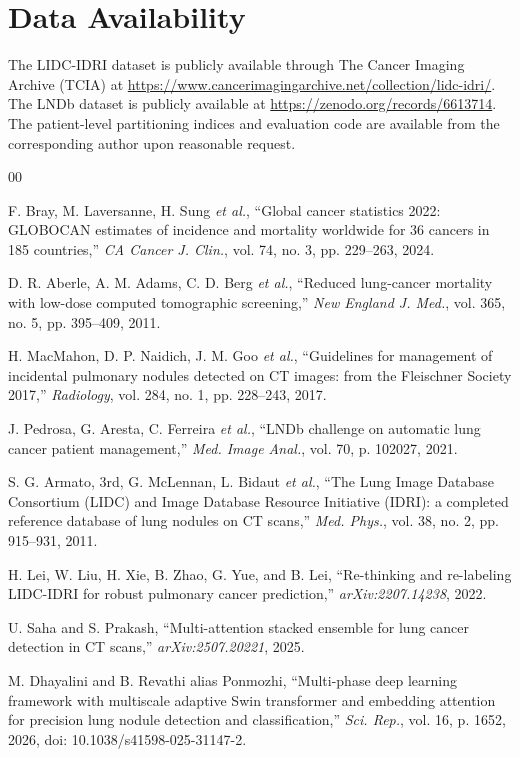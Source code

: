\documentclass{ieeeaccess}
\begin{document}
\section*{Data Availability}
The LIDC-IDRI dataset is publicly available through The Cancer Imaging Archive (TCIA) at \url{https://www.cancerimagingarchive.net/collection/lidc-idri/}. The LNDb dataset is publicly available at \url{https://zenodo.org/records/6613714}. The patient-level partitioning indices and evaluation code are available from the corresponding author upon reasonable request.

\begin{thebibliography}{00}

 F. Bray, M. Laversanne, H. Sung \textit{et al.}, ``Global cancer statistics 2022: GLOBOCAN estimates of incidence and mortality worldwide for 36 cancers in 185 countries,'' \textit{CA Cancer J. Clin.}, vol. 74, no. 3, pp. 229--263, 2024.

 D. R. Aberle, A. M. Adams, C. D. Berg \textit{et al.}, ``Reduced lung-cancer mortality with low-dose computed tomographic screening,'' \textit{New England J. Med.}, vol. 365, no. 5, pp. 395--409, 2011.

 H. MacMahon, D. P. Naidich, J. M. Goo \textit{et al.}, ``Guidelines for management of incidental pulmonary nodules detected on CT images: from the Fleischner Society 2017,'' \textit{Radiology}, vol. 284, no. 1, pp. 228--243, 2017.

 J. Pedrosa, G. Aresta, C. Ferreira \textit{et al.}, ``LNDb challenge on automatic lung cancer patient management,'' \textit{Med. Image Anal.}, vol. 70, p. 102027, 2021.

 S. G. Armato, 3rd, G. McLennan, L. Bidaut \textit{et al.}, ``The Lung Image Database Consortium (LIDC) and Image Database Resource Initiative (IDRI): a completed reference database of lung nodules on CT scans,'' \textit{Med. Phys.}, vol. 38, no. 2, pp. 915--931, 2011.

 H. Lei, W. Liu, H. Xie, B. Zhao, G. Yue, and B. Lei, ``Re-thinking and re-labeling LIDC-IDRI for robust pulmonary cancer prediction,'' \textit{arXiv:2207.14238}, 2022.

 U. Saha and S. Prakash, ``Multi-attention stacked ensemble for lung cancer detection in CT scans,'' \textit{arXiv:2507.20221}, 2025.

 M. Dhayalini and B. Revathi alias Ponmozhi, ``Multi-phase deep learning framework with multiscale adaptive Swin transformer and embedding attention for precision lung nodule detection and classification,'' \textit{Sci. Rep.}, vol. 16, p. 1652, 2026, doi: 10.1038/s41598-025-31147-2.


\end{thebibliography}
\end{document}
